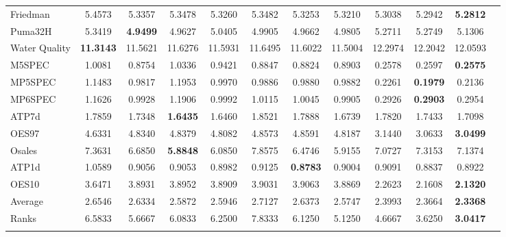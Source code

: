 \documentclass[reqno]{vcuthesis}
\numberwithin{equation}{chapter}
\begin{document}
\begin{table}[H]
{\begin{tabular}{l@{\extracolsep{\fill}}ccccccccccc}
Friedman &5.4573 &5.3357 &5.3478 &5.3260 &5.3482 &5.3253 &5.3210 &5.3038 &5.2942 &\textbf{5.2812}   \\
Puma32H &5.3419 &\textbf{4.9499} &4.9627 &5.0405 &4.9905 &4.9662 &4.9805 &5.2711 &5.2749 &5.1306   \\
Water Quality &\textbf{11.3143} &11.5621 &11.6276 &11.5931 &11.6495 &11.6022 &11.5004 &12.2974 &12.2042 &12.0593   \\
M5SPEC &1.0081 &0.8754 &1.0336 &0.9421 &0.8847 &0.8824 &0.8903 &0.2578 &0.2597 &\textbf{0.2575}   \\
MP5SPEC &1.1483 &0.9817 &1.1953 &0.9970 &0.9886 &0.9880 &0.9882 &0.2261 &\textbf{0.1979} &0.2136   \\
MP6SPEC &1.1626 &0.9928 &1.1906 &0.9992 &1.0115 &1.0045 &0.9905 &0.2926 &\textbf{0.2903} &0.2954   \\
ATP7d &1.7859 &1.7348 &\textbf{1.6435} &1.6460 &1.8521 &1.7888 &1.6739 &1.7820 &1.7433 &1.7098   \\
OES97 &4.6331 &4.8340 &4.8379 &4.8082 &4.8573 &4.8591 &4.8187 &3.1440 &3.0633 &\textbf{3.0499}   \\
Osales &7.3631 &6.6850 &\textbf{5.8848} &6.0850 &7.8575 &6.4746 &5.9155 &7.0727 &7.3153 &7.1374   \\
ATP1d &1.0589 &0.9056 &0.9053 &0.8982 &0.9125 &\textbf{0.8783} &0.9004 &0.9091 &0.8837 &0.8922   \\
OES10 &3.6471 &3.8931 &3.8952 &3.8909 &3.9031 &3.9063 &3.8869 &2.2623 &2.1608 &\textbf{2.1320}   \\
\noalign{\smallskip}\hline\noalign{\smallskip}
Average &2.6546 &2.6334 &2.5872 &2.5946 &2.7127 &2.6373 &2.5747 &2.3993 &2.3664 &\textbf{2.3368}   \\
Ranks &6.5833 &5.6667 &6.0833 &6.2500 &7.8333 &6.1250 &5.1250 &4.6667 &3.6250 &\textbf{3.0417}   \\
\noalign{\smallskip}\hline
\end{tabular}}
\centering \small
{}
\end{table}
\end{document}
